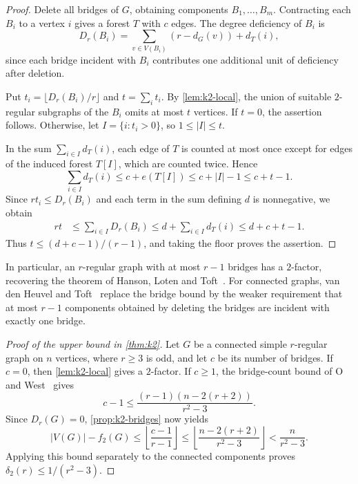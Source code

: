 \documentclass[10pt,a4paper]{amsart}
\begin{document}
\begin{proof}
Delete all bridges of $G$, obtaining components $B_1,\ldots,B_m$. Contracting each $B_i$ to a vertex $i$ gives a forest $T$ with $c$ edges. The degree deficiency of $B_i$ is
\[
D_r(B_i)=\sum_{v\in V(B_i)}(r-d_G(v))+d_T(i),
\]
since each bridge incident with $B_i$ contributes one additional unit of deficiency after deletion.

Put $t_i=\lfloor D_r(B_i)/r\rfloor$ and $t=\sum_i t_i$. By \cref{lem:k2-local}, the union of suitable $2$-regular subgraphs of the $B_i$ omits at most $t$ vertices. If $t=0$, the assertion follows. Otherwise, let $I=\{i:t_i>0\}$, so $1\le|I|\le t$.

In the sum $\sum_{i\in I}d_T(i)$, each edge of $T$ is counted at most once except for edges of the induced forest $T[I]$, which are counted twice. Hence
\[
\sum_{i\in I}d_T(i)
\le c+e(T[I])\le c+|I|-1 \le c+t-1.
\]
Since $rt_i\le D_r(B_i)$ and each term in the sum defining $d$ is nonnegative, we obtain
\[
\begin{aligned}
rt
&\le\sum_{i\in I}D_r(B_i)
\le d+\sum_{i\in I}d_T(i)
\le d+c+t-1.
\end{aligned}
\]
Thus $t\le(d+c-1)/(r-1)$, and taking the floor proves the assertion.
\end{proof}

In particular, an $r$-regular graph with at most $r-1$ bridges has a $2$-factor, recovering the theorem of Hanson, Loten and Toft~\cite{HLT1998}. For connected graphs, van den Heuvel and Toft~\cite[Theorem~1.9]{HT2026} replace the bridge bound by the weaker requirement that at most \(r-1\) components obtained by deleting the bridges are incident with exactly one bridge.


\begin{proof}[Proof of the upper bound in \cref{thm:k2}]
Let $G$ be a connected simple $r$-regular graph on $n$ vertices, where $r\ge3$ is odd, and let $c$ be its number of bridges. If $c=0$, then \cref{lem:k2-local} gives a $2$-factor. If $c\ge1$, the bridge-count bound of O and West~\cite[Theorem~3.4]{OW2010} gives
\[
c-1\le\frac{(r-1)(n-2(r+2))}{r^2-3}.
\]
Since $D_r(G)=0$, \cref{prop:k2-bridges} now yields
\[
|V(G)|-f_2(G)
\le\left\lfloor\frac{c-1}{r-1}\right\rfloor
\le\left\lfloor\frac{n-2(r+2)}{r^2-3}\right\rfloor
<\frac{n}{r^2-3}.
\]
Applying this bound separately to the connected components proves $\delta_2(r)\le1/(r^2-3)$.
\end{proof}
\end{document}
